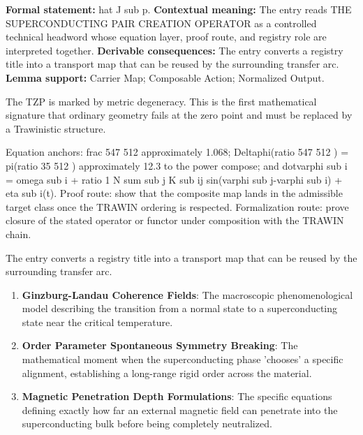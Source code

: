 \begingroup\footnotesize\setlength{\emergencystretch}{3em}\sloppy
\textbf{Formal statement:} hat J sub p. \textbf{Contextual meaning:} The entry reads THE SUPERCONDUCTING PAIR CREATION OPERATOR as a controlled technical headword whose equation layer, proof route, and registry role are interpreted together. \textbf{Derivable consequences:} The entry converts a registry title into a transport map that can be reused by the surrounding transfer arc. \textbf{Lemma support:} Carrier Map; Composable Action; Normalized Output.\par
\endgroup

The TZP is marked by metric degeneracy. This is the first mathematical signature that ordinary geometry fails at the zero point and must be replaced by a Trawinistic structure.

Equation anchors: frac 547 512 approximately 1.068; Deltaphi(ratio 547 512 ) = pi(ratio 35 512 ) approximately 12.3 to the power compose; and dotvarphi sub i = omega sub i + ratio 1 N sum sub j K sub ij sin(varphi sub j-varphi sub i) + eta sub i(t). Proof route: show that the composite map lands in the admissible target class once the TRAWIN ordering is respected. Formalization route: prove closure of the stated operator or functor under composition with the TRAWIN chain.

The entry converts a registry title into a transport map that can be reused by the surrounding transfer arc.
\endgroup

\begin{enumerate}[leftmargin=1.6em,itemsep=6pt,topsep=4pt]
\item \textbf{Ginzburg-Landau Coherence Fields}: The macroscopic phenomenological model describing the transition from a normal state to a superconducting state near the critical temperature.
\item \textbf{Order Parameter Spontaneous Symmetry Breaking}: The mathematical moment when the superconducting phase 'chooses' a specific alignment, establishing a long-range rigid order across the material.
\item \textbf{Magnetic Penetration Depth Formulations}: The specific equations defining exactly how far an external magnetic field can penetrate into the superconducting bulk before being completely neutralized.
\end{enumerate}

